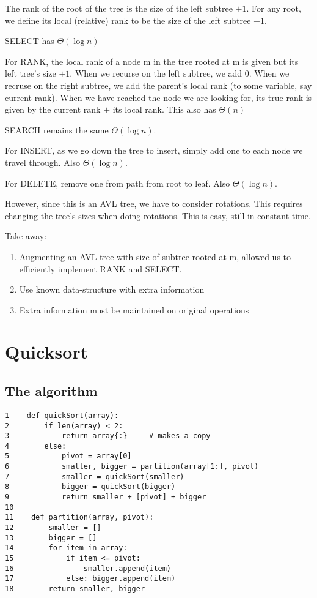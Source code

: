 \documentclass[11pt]{article}
\begin{document}
The rank of the root of the tree is the size of the left subtree $+1$. For any root, we define its local (relative) rank to be the size of the left subtree $+1$. 

SELECT has $\Theta(\log n)$

For RANK, the local rank of a node m in the tree rooted at m is given but its left tree's size $+1$. When we recurse on the left subtree, we add 0. When we recruse on the right subtree, we add the parent's local rank (to some variable, say current rank). When we have reached the node we are looking for, its true rank is given by the current rank $+$ its local rank. This also has $\Theta(n)$

SEARCH remains the same $\Theta(\log n)$. 

For INSERT, as we go down the tree to insert, simply add one to each node we travel through. Also $\Theta(\log n)$.

For DELETE, remove one from path from root to leaf. Also $\Theta(\log n)$. 

However, since this is an AVL tree, we have to consider rotations. This requires changing the tree's sizes when doing rotations. This is easy, still in constant time. 

Take-away: 
\begin{enumerate}
    \item Augmenting an AVL tree with size of subtree rooted at m, allowed us to efficiently implement RANK and SELECT. 
    \item Use known data-structure with extra information 
    \item Extra information must be maintained on original operations
\end{enumerate}

\newpage
\section{Quicksort}
\subsection{The algorithm}
\begin{verbatim}
1    def quickSort(array): 
2        if len(array) < 2: 
3            return array{:}     # makes a copy
4        else:
5            pivot = array[0]
6            smaller, bigger = partition(array[1:], pivot) 
7            smaller = quickSort(smaller)
8            bigger = quickSort(bigger)
9            return smaller + [pivot] + bigger
10    
11    def partition(array, pivot): 
12        smaller = []
13        bigger = []
14        for item in array: 
15            if item <= pivot: 
16                smaller.append(item)
17            else: bigger.append(item)
18        return smaller, bigger
\end{verbatim}
\end{document}
